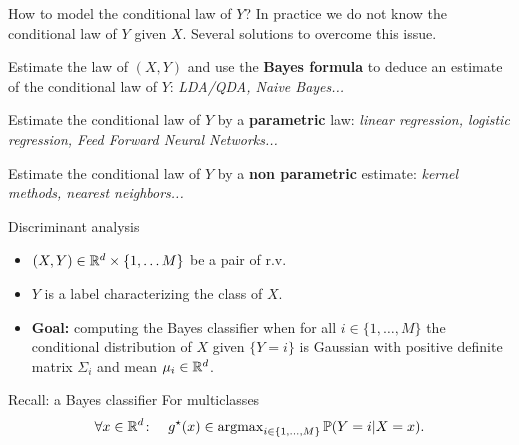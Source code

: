 \documentclass[xcolor={usenames,dvipsnames},handout]{beamer}
\begin{document}
\begin{frame}{How to model the conditional law of $Y$?}
 In practice \alert{we do not know  the conditional law of $Y$ given $X$}. Several solutions to overcome this issue.


\vspace{.4cm}


    
     Estimate the law of $(X,Y)$
      and use the \textbf{Bayes formula} to deduce an estimate of
      the conditional law of $Y$: \emph{LDA/QDA, Naive Bayes...}

\vspace{.3cm}

    
     Estimate the conditional law of
      $Y$ by a \textbf{parametric} law: \emph{linear regression, logistic regression, Feed Forward Neural Networks...}

\vspace{.3cm}

    
     Estimate the conditional  law of
      $Y$ by a \textbf{non parametric} estimate: \emph{kernel
        methods, nearest neighbors...}

 
\end{frame}
\begin{frame}{Discriminant analysis}	
\begin{itemize}
	\item $(X, Y) \in \mathbb{R}^d \times \{1, \hdots M\}$ be a pair of r.v.\, 

\vspace{.2cm}

	\item $Y$ is a label characterizing the class of $X$.

\vspace{.2cm}

	\item \textbf{Goal:} computing the Bayes classifier when for all $i \in \{1, \hdots , M\}$ the conditional distribution of \alert{$X$ given $\{Y = i \}$  is Gaussian with  positive definite matrix $\Sigma_i$ and mean  $\mu_i \in \mathbb{R}^d$}.

\end{itemize}

\vspace{.3cm}

\begin{exampleblock}{Recall: a Bayes classifier}
	For multiclasses
	$$
		\forall x \in \mathbb{R}^d \colon \quad
		g^\star(x) \in \operatorname{argmax}_{i \in \{1,\ldots,M\}}\mathbb{P} (Y=i | X=x).
	$$
\end{exampleblock}




\end{frame}
\end{document}
